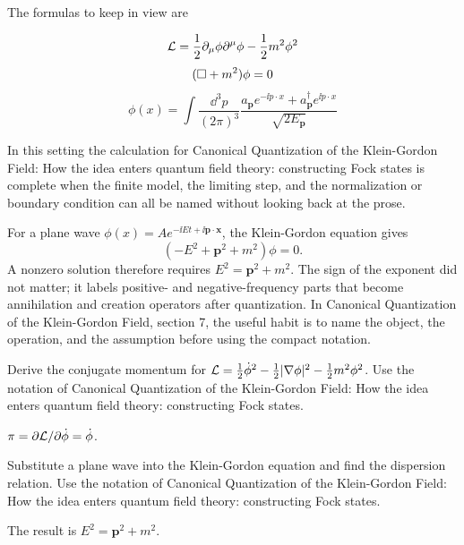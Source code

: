 The formulas to keep in view are

\[
  \mathcal L=\frac12\partial_\mu\phi\partial^\mu\phi-\frac12m^2\phi^2
\]
\[
  (\Box+m^2)\phi=0
\]
\[
  \phi(x)=\int\frac{\dd^3p}{(2\pi)^3}\frac{a_{\bm p}e^{-\ii p\cdot x}+a_{\bm p}^\dagger e^{\ii p\cdot x}}{\sqrt{2E_{\bm p}}}
\]

In this setting the calculation for Canonical Quantization of the Klein-Gordon Field: How the idea enters quantum field theory: constructing Fock states is complete when the finite model, the limiting step, and the normalization or boundary condition can all be named without looking back at the prose.




\begin{example}
For a plane wave \(\phi(x)=Ae^{-\ii Et+\ii\bm p\cdot\bm x}\), the Klein-Gordon equation gives
\[
  (-E^2+\bm p^2+m^2)\phi=0.
\]
A nonzero solution therefore requires \(E^2=\bm p^2+m^2\).  The sign of the exponent did not matter; it labels positive- and negative-frequency parts that become annihilation and creation operators after quantization.  In Canonical Quantization of the Klein-Gordon Field, section 7, the useful habit is to name the object, the operation, and the assumption before using the compact notation.
\end{example}



\begin{exercise}
Derive the conjugate momentum for \(\mathcal L=\frac12\dot\phi^2-\frac12|\nabla\phi|^2-\frac12m^2\phi^2\).  Use the notation of Canonical Quantization of the Klein-Gordon Field: How the idea enters quantum field theory: constructing Fock states.
\begin{answer}
\(\pi=\partial\mathcal L/\partial\dot\phi=\dot\phi\).
\end{answer}
\end{exercise}

\begin{exercise}
Substitute a plane wave into the Klein-Gordon equation and find the dispersion relation.  Use the notation of Canonical Quantization of the Klein-Gordon Field: How the idea enters quantum field theory: constructing Fock states.
\begin{answer}
The result is \(E^2=\bm p^2+m^2\).
\end{answer}
\end{exercise}



